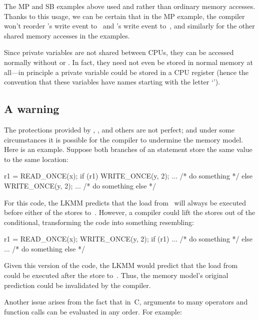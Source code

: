 The MP and SB examples above used  and 
rather than ordinary memory accesses.
Thanks to this usage, we can be certain that in the MP example, the
compiler won't reorder 's write event to~ and 's write
event to~, and similarly for the other shared memory accesses
in the examples.

Since private variables are not shared between CPUs, they can be
accessed normally without  or .
In fact, they need not even be stored in normal memory at
all---in principle a private variable could be stored in a CPU
register (hence the convention that these variables have names
starting with the letter `').


\subsection{A warning}
\label{sec:docs:explanation:A Warning}

The protections provided by , , and
others are not perfect; and under some circumstances it is possible
for the compiler to undermine the memory model.
Here is an example.
Suppose both branches of an  statement store the same value
to the same location:

\begin{VerbatimU}
	r1 = READ_ONCE(x);
	if (r1) {
		WRITE_ONCE(y, 2);
		...  /* do something */
	} else {
		WRITE_ONCE(y, 2);
		...  /* do something else */
	}
\end{VerbatimU}

For this code, the LKMM predicts that the load from~ will always be
executed before either of the stores to~.
However, a compiler could lift the stores out of the conditional,
transforming the code into something resembling:

\begin{VerbatimU}
	r1 = READ_ONCE(x);
	WRITE_ONCE(y, 2);
	if (r1) {
		...  /* do something */
	} else {
		...  /* do something else */
	}
\end{VerbatimU}

Given this version of the code, the LKMM would predict that the load
from~ could be executed after the store to~.
Thus, the memory model's original prediction could be invalidated
by the compiler.

Another issue arises from the fact that in~C, arguments to many
operators and function calls can be evaluated in any order.
For example:

